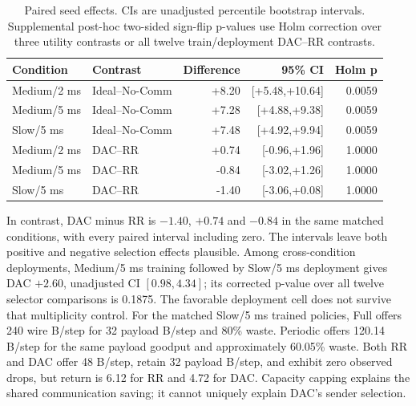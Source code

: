 \documentclass[pdflatex,sn-mathphys-num]{sn-jnl}
\begin{document}
\begin{table}[htbp]\centering\setlength{\tabcolsep}{1.3pt}\small
\caption{Paired seed effects. CIs are unadjusted percentile bootstrap intervals. Supplemental post-hoc two-sided sign-flip p-values use Holm correction over three utility contrasts or all twelve train/deployment DAC--RR contrasts.}\label{tab:paired}
\vspace{3mm}
{\footnotesize\setlength{\tabcolsep}{1.3pt}\begin{tabular}{llrrr}\toprule
Condition & Contrast & Difference & 95\% CI & Holm p\\\midrule
Medium/2 ms & Ideal--No-Comm & +8.20 & [+5.48,+10.64] & 0.0059\\
Medium/5 ms & Ideal--No-Comm & +7.28 & [+4.88,+9.38] & 0.0059\\
Slow/5 ms & Ideal--No-Comm & +7.48 & [+4.92,+9.94] & 0.0059\\
Medium/2 ms & DAC--RR & +0.74 & [-0.96,+1.96] & 1.0000\\
Medium/5 ms & DAC--RR & -0.84 & [-3.02,+1.26] & 1.0000\\
Slow/5 ms & DAC--RR & -1.40 & [-3.06,+0.08] & 1.0000\\
\bottomrule\end{tabular}}\end{table}
In contrast, DAC minus RR is $-1.40$, $+0.74$ and $-0.84$ in the same matched conditions, with every paired interval including zero. The intervals leave both positive and negative selection effects plausible. Among cross-condition deployments, Medium/5 ms training followed by Slow/5 ms deployment gives DAC $+2.60$, unadjusted CI $[0.98,4.34]$; its corrected p-value over all twelve selector comparisons is 0.1875. The favorable deployment cell does not survive that multiplicity control.
For the matched Slow/5 ms trained policies, Full offers 240 wire B/step for 32 payload B/step and 80\% waste. Periodic offers 120.14 B/step for the same payload goodput and approximately 60.05\% waste. Both RR and DAC offer 48 B/step, retain 32 payload B/step, and exhibit zero observed drops, but return is 6.12 for RR and 4.72 for DAC. Capacity capping explains the shared communication saving; it cannot uniquely explain DAC's sender selection.
\end{document}
